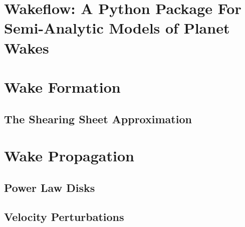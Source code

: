 \section{Wakeflow: A Python Package For Semi-Analytic Models of Planet Wakes}

\section{Wake Formation}

\subsection{The Shearing Sheet Approximation}

\section{Wake Propagation}

\subsection{Power Law Disks}

\subsection{Velocity Perturbations}

